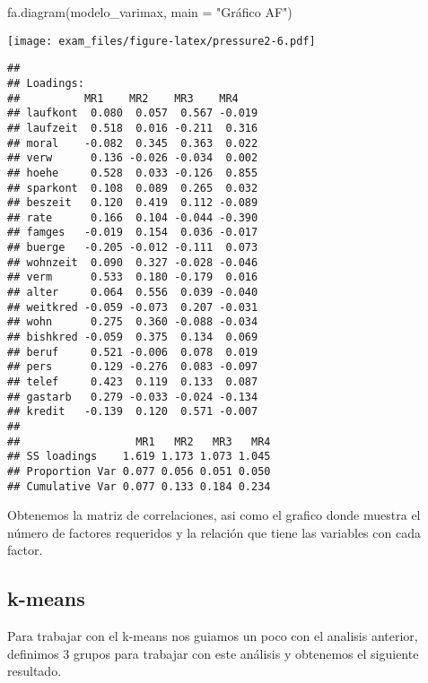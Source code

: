 \documentclass[
]{article}
\newenvironment{Shaded}{\begin{snugshade}}{\end{snugshade}}
\newcommand{\AttributeTok}[1]{\textcolor[rgb]{0.77,0.63,0.00}{#1}}
\newcommand{\DecValTok}[1]{\textcolor[rgb]{0.00,0.00,0.81}{#1}}
\newcommand{\FunctionTok}[1]{\textcolor[rgb]{0.00,0.00,0.00}{#1}}
\newcommand{\NormalTok}[1]{#1}
\newcommand{\SpecialCharTok}[1]{\textcolor[rgb]{0.00,0.00,0.00}{#1}}
\newcommand{\StringTok}[1]{\textcolor[rgb]{0.31,0.60,0.02}{#1}}
\begin{document}
\begin{Shaded}
\begin{Highlighting}[]
  \FunctionTok{fa.diagram}\NormalTok{(modelo\_varimax, }\AttributeTok{main =} \StringTok{"Gráfico AF"}\NormalTok{)}
\end{Highlighting}
\end{Shaded}

\texttt{[image: exam\_files/figure-latex/pressure2-6.pdf]}

\begin{Shaded}
\end{Shaded}

\begin{verbatim}
## 
## Loadings:
##          MR1    MR2    MR3    MR4   
## laufkont  0.080  0.057  0.567 -0.019
## laufzeit  0.518  0.016 -0.211  0.316
## moral    -0.082  0.345  0.363  0.022
## verw      0.136 -0.026 -0.034  0.002
## hoehe     0.528  0.033 -0.126  0.855
## sparkont  0.108  0.089  0.265  0.032
## beszeit   0.120  0.419  0.112 -0.089
## rate      0.166  0.104 -0.044 -0.390
## famges   -0.019  0.154  0.036 -0.017
## buerge   -0.205 -0.012 -0.111  0.073
## wohnzeit  0.090  0.327 -0.028 -0.046
## verm      0.533  0.180 -0.179  0.016
## alter     0.064  0.556  0.039 -0.040
## weitkred -0.059 -0.073  0.207 -0.031
## wohn      0.275  0.360 -0.088 -0.034
## bishkred -0.059  0.375  0.134  0.069
## beruf     0.521 -0.006  0.078  0.019
## pers      0.129 -0.276  0.083 -0.097
## telef     0.423  0.119  0.133  0.087
## gastarb   0.279 -0.033 -0.024 -0.134
## kredit   -0.139  0.120  0.571 -0.007
## 
##                  MR1   MR2   MR3   MR4
## SS loadings    1.619 1.173 1.073 1.045
## Proportion Var 0.077 0.056 0.051 0.050
## Cumulative Var 0.077 0.133 0.184 0.234
\end{verbatim}

Obtenemos la matriz de correlaciones, asi como el grafico donde muestra
el número de factores requeridos y la relación que tiene las variables
con cada factor.

\hypertarget{k-means}{%
\subsection{k-means}\label{k-means}}

Para trabajar con el k-means nos guiamos un poco con el analisis
anterior, definimos 3 grupos para trabajar con este análisis y obtenemos
el siguiente resultado.
\end{document}
